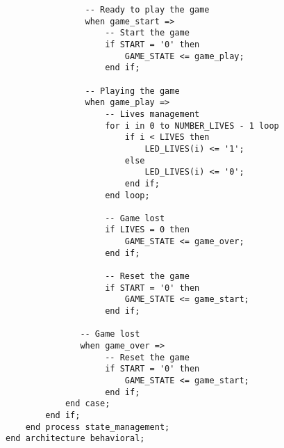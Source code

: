 \begin{verbatim}
                -- Ready to play the game
                when game_start =>
                    -- Start the game  
                    if START = '0' then
                        GAME_STATE <= game_play;
                    end if;
                    
                -- Playing the game
                when game_play =>  
                    -- Lives management
                    for i in 0 to NUMBER_LIVES - 1 loop
                        if i < LIVES then
                            LED_LIVES(i) <= '1';
                        else
                            LED_LIVES(i) <= '0';
                        end if;
                    end loop;
                    
                    -- Game lost
                    if LIVES = 0 then
                        GAME_STATE <= game_over;
                    end if;

                    -- Reset the game
                    if START = '0' then
                        GAME_STATE <= game_start; 
                    end if;
     
               -- Game lost
               when game_over =>
                    -- Reset the game
                    if START = '0' then
                        GAME_STATE <= game_start;
                    end if;
            end case;
        end if;
    end process state_management;
end architecture behavioral;

\end{verbatim}
